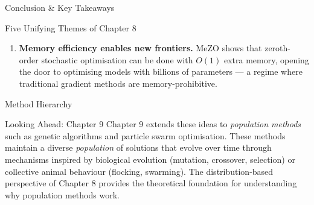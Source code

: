 \documentclass[aspectratio=169,10pt]{beamer}
\begin{document}
\begin{frame}[allowframebreaks]{Conclusion \& Key Takeaways}
\begin{block}{Five Unifying Themes of Chapter 8}
\begin{enumerate}
  \item \textbf{Memory efficiency enables new frontiers.} MeZO shows that zeroth-order stochastic optimisation can be done with $O(1)$ extra memory, opening the door to optimising models with billions of parameters --- a regime where traditional gradient methods are memory-prohibitive.
\end{enumerate}
\end{block}

\begin{block}{Method Hierarchy}
\begin{center}
\end{center}
\end{block}

\begin{block}{Looking Ahead: Chapter 9}
Chapter 9 extends these ideas to \emph{population methods} such as genetic algorithms and particle swarm optimisation.
These methods maintain a diverse \emph{population} of solutions that evolve over time through mechanisms inspired by biological evolution (mutation, crossover, selection) or collective animal behaviour (flocking, swarming).
The distribution-based perspective of Chapter 8 provides the theoretical foundation for understanding why population methods work.
\end{block}

\end{frame}
\end{document}
